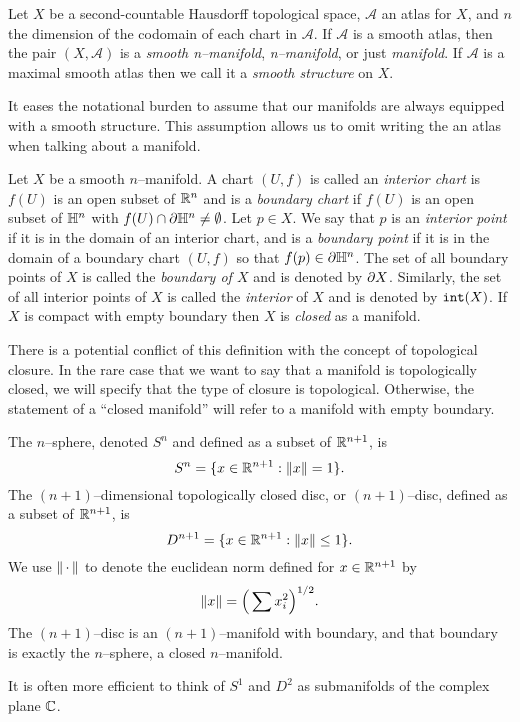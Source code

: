 \begin{defn}[Manifold]
	\label{def:manifold}
	Let $X$ be a second-countable Hausdorff topological space, $\mathcal{A}$ an atlas for $X$, and $n$ the dimension of the codomain of each chart in $\mathcal{A}$.
	If $\mathcal{A}$ is a smooth atlas, then the pair $(X,\mathcal{A})$ is a \emph{smooth n--manifold},  \emph{n--manifold}, or just \emph{manifold}.
	If $\mathcal{A}$ is a maximal smooth atlas then we call it a \emph{smooth structure} on $X$.
\end{defn}

It eases the notational burden to assume that our manifolds are always equipped with a smooth structure.
This assumption allows us to omit writing the an atlas when talking about a manifold.
	
\begin{defn}[Boundary]
	Let $X$ be a smooth $n$--manifold.
	A chart $(U,f)$ is called an \emph{interior chart} is $f(U)$ is an open subset of $\mathbb{R}^n$ and is a \emph{boundary chart} if $f(U)$ is an open subset of $\mathbb{H}^n$ with $f(U)\cap\partial \mathbb{H}^n\neq\emptyset$.
	Let $p\in X$.
	We say that $p$ is an \emph{interior point} if it is in the domain of an interior chart, and is a \emph{boundary point} if it is in the domain of a boundary chart $(U,f)$ so that $f(p)\in\partial\mathbb{H}^n$.
	The set of all boundary points of $X$ is called the \emph{boundary of $X$} and is denoted by $\partial X$.
	Similarly, the set of all interior points of $X$ is called the \emph{interior} of $X$ and is denoted by $\mathtt{int}(X)$.
	If $X$ is compact with empty boundary then $X$ is \emph{closed} as a manifold.
\end{defn}

There is a potential conflict of this definition with the concept of topological closure.
In the rare case that we want to say that a manifold is topologically closed, we will specify that the type of closure is topological.
Otherwise, the statement of a ``closed manifold'' will refer to a manifold with empty boundary.

\begin{ex}
	The $n$--sphere, denoted $S^n$ and defined as a subset of $\mathbb{R}^{n+1}$, is
	\[
	S^n = \{x\in\mathbb{R}^{n+1}:\left\lVert x \right\rVert=1\}.
	\]
	The $(n+1)$--dimensional topologically closed disc, or $(n+1)$--disc, defined as a subset of $\mathbb{R}^{n+1}$, is
	\[
	D^{n+1} = \{x\in\mathbb{R}^{n+1}:\left\lVert x \right\rVert\leq 1\}.
	\]
	We use $\left\lVert \,\cdot\, \right\rVert$ to denote the euclidean norm defined for $x\in\mathbb{R}^{n+1}$ by
	\[
	\left\lVert x \right\rVert = \Big( \sum x_i^2 \Big)^{1/2}.
	\]
	The $(n+1)$--disc is an $(n+1)$--manifold with boundary, and that boundary is exactly the $n$--sphere, a closed $n$--manifold.
	
	It is often more efficient to think of $S^1$ and $D^2$ as submanifolds of the complex plane $\mathbb{C}$.
\end{ex}
